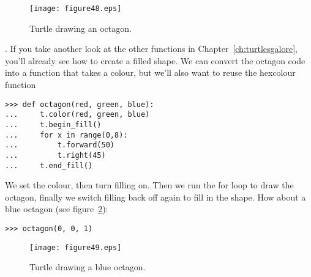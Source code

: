 \begin{figure}
\begin{center}
\texttt{[image: figure48.eps]}
\end{center}
\caption{Turtle drawing an octagon.}\label{fig48}
\end{figure}

.  If you take another look at the other functions in Chapter~\ref{ch:turtlesgalore}, you'll already see how to create a filled shape. We can convert the octagon code into a function that takes a colour, but we'll also want to reuse the hexcolour function 

\begin{listing}
\begin{verbatim}
>>> def octagon(red, green, blue):
...     t.color(red, green, blue)
...     t.begin_fill()
...     for x in range(0,8):
...         t.forward(50)
...         t.right(45)
...     t.end_fill()
\end{verbatim}
\end{listing}

We set the colour, then turn filling on.  Then we run the for loop to draw the octagon, finally we switch filling back off again to fill in the shape. How about a blue octagon (see figure~\ref{fig49}):

\begin{listing}
\begin{verbatim}
>>> octagon(0, 0, 1)
\end{verbatim}
\end{listing}

\begin{figure}
\begin{center}
\texttt{[image: figure49.eps]}
\end{center}
\caption{Turtle drawing a blue octagon.}\label{fig49}
\end{figure}
\newpage